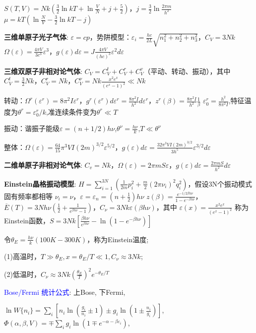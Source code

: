 \documentclass[a4paper,8pt]{extarticle} %
\newcommand{\bluetext}[1]{\textcolor{blue}{#1}}
\begin{document}
\begin{multicols}{3}
$S(T,V) = Nk(\frac{3}{2}\ln kT + \ln \frac{V}{N} + j + \frac{5}{2})$，$j = \frac{3}{2}\ln \frac{2\pi m}{h^2}$
$\mu = kT(\ln \frac{N}{V} - \frac{3}{2}\ln kT - j)$

\textbf{三维单原子光子气体}:
$\varepsilon = cp$，势阱模型：$\varepsilon_i = \frac{hc}{2L}\sqrt{n_1^2+n_2^2+n_3^2}$，$C_V = 3Nk$
$\Omega(\varepsilon) = \frac{4\pi V}{3c^3}\varepsilon^3$，$g(\varepsilon)d\varepsilon = J\frac{4\pi V}{(hc)^3}\varepsilon^2d\varepsilon$

\textbf{三维双原子非相对论气体}:
$C_V = C_V^t + C_V^r + C_V^v$（平动、转动、振动），其中 $C_V^t = \frac{3}{2}Nk$，$C_V^r = Nk$，$C_V^\nu = Nk\frac{x^2e^x}{(e^x-1)^2} \ll Nk$

转动：$\Omega^r(\varepsilon^r) = 8\pi^2I\varepsilon^r$，$g^r(\varepsilon^r)d\varepsilon^r = \frac{8\pi^2I}{h^2}d\varepsilon^r$，$z^r(\beta) = \frac{8\pi^2I}{h^2}\frac{1}{\beta}$
$\varepsilon_0^r = \frac{h^2}{8\pi^2I}$,特征温度为$\theta^r=\varepsilon_0^r/k$,准连续条件变为$\theta^r \ll T$

振动：谐振子能级$\varepsilon=(n+1/2)h\nu$,$\theta^\nu = \frac{h\nu}{k}$,$T \ll \theta^\nu$

整体：$\Omega(\varepsilon) = \frac{64}{15}\pi^3VI(2m)^{3/2}\varepsilon^{5/2}$，$g(\varepsilon)d\varepsilon = \frac{32\pi^3VI(2m)^{3/2}}{3h^5}\varepsilon^{3/2}d\varepsilon$

\textbf{二维单原子非相对论气体}:
$C_v = Nk$，$\Omega(\varepsilon) = 2\pi mS\varepsilon$，$g(\varepsilon)d\varepsilon = \frac{2\pi mS}{h^2}d\varepsilon$

\textbf{Einstein晶格振动模型}:
$H = \sum_{i=1}^{3N}(\frac{1}{2m}p_i^2 + \frac{m}{2}(2\pi\nu_i)^2q_i^2)$，假设3N个振动模式固有频率都相等 $\nu_i = \nu$，$\varepsilon = \varepsilon_n = (n+\frac{1}{2})h\nu$
$z(\beta) = \frac{e^{-1/2\beta h\nu}}{1-e^{-\beta h\nu}}$，$\overline{E}(T) = 3Nh\nu(\frac{1}{2} + \frac{1}{e^{\beta h\nu}-1})$，$C_\nu = 3Nk\varepsilon(\beta h\nu)$，其中
$\varepsilon(x) = \frac{x^2e^x}{(e^x-1)^2}$ 称为Einstein函数，$S = 3Nk[\frac{\beta h\nu}{e^{\beta h\nu}} - \ln(1-e^{-\beta h\nu})]$

令$\theta_E = \frac{h\nu}{k}(100K-300K)$，称为Einstein温度;

(1)高温时，$T \gg \theta_E, x=\theta_E/T \ll 1, C_\nu \approx 3Nk$;

(2)低温时，$C_\nu \approx 3Nk(\frac{\theta_E}{T})^2e^{-\theta_E/T}$

\bluetext{Bose/Fermi 统计公式}: 上Bose, 下Fermi,

$\ln W\{n_i\} = \sum_i \left[n_i\ln\left(\frac{g_i}{n_i} \pm 1 \right) \pm g_i\ln\left(1 \pm \frac{n_i}{g_i}\right)\right]$,
$\Phi(\alpha,\beta,V) = \mp \sum_i g_i\ln\left(1 \mp e^{-\alpha-\beta\varepsilon_i}\right)$,


\end{multicols}
\end{document}
